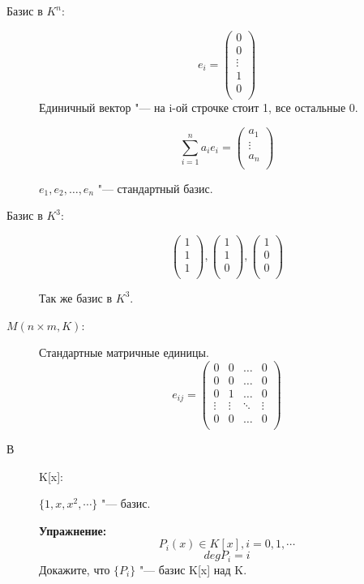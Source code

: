 \begin{exmp}
\begin{description}
\item [Базис в $K^n$:]

$$e_i = 
\begin{pmatrix}
0\\
0\\
\vdots\\
1\\
0\\
\end{pmatrix}$$ 
Единичный вектор "--- на i-ой строчке стоит 1, все остальные 0.

$$
\sum_{i = 1}^{n}a_ie_i = 
\begin{pmatrix}
a_1\\
\vdots\\
a_n\\
\end{pmatrix}
$$

$e_1, e_2, \ldots, e_n$ "--- стандартный базис.

\item[Базис в $K^3$:]
$$
\begin{pmatrix}
1\\1\\1\\
\end{pmatrix}
,
\begin{pmatrix}
1\\1\\0\\
\end{pmatrix}
,
\begin{pmatrix}
1\\0\\0\\
\end{pmatrix}
$$

Так же базис в $K^3$.

\item [$M(n \times m, K)$:]

Стандартные матричные единицы.
$$e_{ij} = 
\begin{pmatrix} 
0&0&\ldots&0\\
0&0&\ldots&0\\
0&1&\ldots&0\\
\vdots&\vdots&\ddots&\vdots\\
0&0&\ldots&0\\
\end{pmatrix}$$

\item[В]K[x]:

$\{1, x, x^2, \cdots \}$ "--- базис.

\textbf{Упражнение:}
$$P_i(x) \in K[x], i = 0, 1, \cdots$$
$$deg P_i = i$$
Докажите, что $\{P_i\}$ "--- базис K[x] над K. 
\end{description}                            	
\end{exmp}

